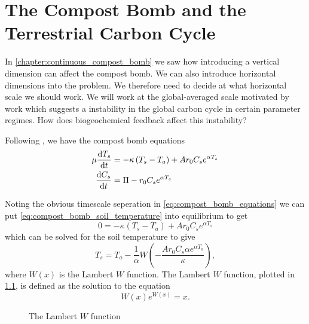 \chapter{The Compost Bomb and the Terrestrial Carbon Cycle}
\label{chapter:global_bomb}
\graphicspath{{global_bomb/figs/}}



In \cref{chapter:continuous_compost_bomb} we saw how introducing a vertical dimension can affect the compost bomb.
We can also introduce horizontal dimensions into the problem. We therefore need to decide at what horizontal scale we
should work. We will work at the global-averaged scale motivated by work \parencite{Cox2006} which suggests a instability in the global
carbon cycle in certain parameter regimes. How does biogeochemical feedback affect this instability?

Following \cite{Luke2011}, we have the compost bomb equations
\begin{subequations}
  \label{eq:compost_bomb_equations}
  \begin{align}
    \mu \dv{T_s}{t} &= - \kappa \left(T_s - T_a\right) + Ar_0C_se^{\alpha T_s} \label{eq:compost_bomb_soil_temperature} \\
    \dv{C_s}{t} &= \Pi - r_0C_se^{\alpha T_s} \label{eq:compost_bomb_soil_carbon}
  \end{align}
\end{subequations}

Noting the obvious timescale seperation in \cref{eq:compost_bomb_equations} we can put \cref{eq:compost_bomb_soil_temperature} into
equilibrium to get
\begin{equation*}
  0 = - \kappa \left(T_s - T_a\right) + Ar_0C_se^{\alpha T_s}
\end{equation*}
which can be solved for the soil temperature to  give
\begin{equation}
  \label{eq:soil_temperature_equilibrium}
  T_s = T_a - \frac{1}{\alpha} W\left(-\frac{Ar_0C_s \alpha e^{\alpha T_a}}{\kappa} \right),
\end{equation}
where $W(x)$ is the Lambert $W$ function. The Lambert $W$ function, plotted in \cref{fig:lambert_W}, is defined as the solution to the equation
\begin{equation}
  \label{eq:lambert_W}
  W(x)e^{W(x)} = x.
\end{equation}

\begin{figure}
  \centering
  \caption{The Lambert $W$ function}
  \label{fig:lambert_W}
\end{figure}

